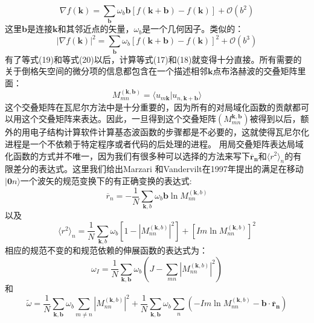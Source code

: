 \begin{equation}
\nabla f(\bm{k})=\sum_{\bm{b}}\omega_b\bm{b}[f(\bm{k}+\bm{b})-f(\bm{k})]+\mathcal{O}(b^2)
\end{equation}
这里$\bm{b}$是连接$\bm{k}$和其邻近点的矢量，$\omega_b$是一个几何因子。类似的：
\begin{equation}
|\nabla f(\bm{k})|^2=\sum_{\bm{b}}\omega_b[f(\bm{k}+\bm{b})-f(\bm{k})]^2+\mathcal{O}(b^3)
\end{equation}
有了等式(19)和等式(20)以后，计算等式(17)和(18)就变得十分直接。所有需要的关于倒格矢空间的微分项的信息都包含在一个描述相邻$\bm{k}$点布洛赫波的交叠矩阵里面：
\begin{equation}
M^{(\bm{k},\bm{b})}_{mn}=\langle u_{m \bm{k}}|u_{n,\bm{k}+\bm{b}} \rangle
\end{equation}
这个交叠矩阵在瓦尼尔方法中是十分重要的，因为所有的对局域化函数的贡献都可以用这个交叠矩阵来表达。因此，一旦得到这个交叠矩阵$(M^{\bm{k},\bm{b}}_{mn})$被得到以后，额外的用电子结构计算软件计算基态波函数的步骤都是不必要的，这就使得瓦尼尔化进程是一个不依赖于特定程序或者代码的后处理的进程。
用局交叠矩阵表达局域化函数的方式并不唯一，因为我们有很多种可以选择的方法来写下$\bm{\overline r_n}$和$\langle r^2\rangle_n$的有限差分的表达式。这里我们给出Marzari 和Vandervilt在1997年提出的满足在移动$|\bm{0}n \rangle$一个波矢的规范变换下的有正确变换的表达式:
\begin{equation}
\overline r_{n}=-\frac{1}{N}\sum_{\bm{k},b}\omega_b\bm{b}\ln M^{(\bm{k},b)}_{nn}
\end{equation}
以及
\begin{equation}
\langle r^2\rangle_{n}=\frac{1}{N}\sum_{\bm{k},b}\omega_b{[1-|M^{(\bm{k},b)}_{nn}|^2]+[Im \ln M^{(\bm{k},b)}_{nn} ]^2}
\end{equation}
相应的规范不变的和规范依赖的伸展函数的表达式为：
\begin{equation}
\omega_I=\frac{1}{N}\sum_{\bm{k},\bm{b}}\omega_b(J-\sum_{mn}|M^{(\bm{k},b)}_{nn}|^2)
\end{equation}
和
\begin{equation}
\widetilde \omega=\frac{1}{N}\sum_{\bm{k},\bm{b}}\omega_b\sum_{m \neq n}|M^{(\bm{k},b)}_{nn}|^2+\frac{1}{N}\sum_{\bm{k},\bm{b}}\omega_b\sum_{n}(-Im \ln M^{(\bm{k},b)}_{nn}-\bm{b} \cdot \bm{\overline r_n})
\end{equation}

